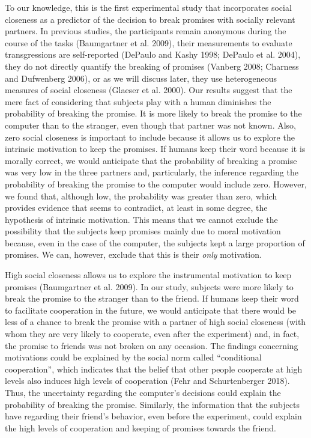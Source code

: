 \documentclass[smallextended]{svjour3}       %
\begin{document}
To our knowledge, this is the first experimental study that incorporates
social closeness as a predictor of the decision to break promises with
socially relevant partners. In previous studies, the participants remain
anonymous during the course of the tasks (Baumgartner et al. 2009),
their measurements to evaluate transgressions are self-reported (DePaulo
and Kashy 1998; DePaulo et al. 2004), they do not directly quantify the
breaking of promises (Vanberg 2008; Charness and Dufwenberg 2006), or as
we will discuss later, they use heterogeneous measures of social
closeness (Glaeser et al. 2000). Our results suggest that the mere fact
of considering that subjects play with a human diminishes the
probability of breaking the promise. It is more likely to break the
promise to the computer than to the stranger, even though that partner
was not known. Also, zero social closeness is important to include
because it allows us to explore the intrinsic motivation to keep the
promises. If humans keep their word because it is morally correct, we
would anticipate that the probability of breaking a promise was very low
in the three partners and, particularly, the inference regarding the
probability of breaking the promise to the computer would include zero.
However, we found that, although low, the probability was greater than
zero, which provides evidence that seems to contradict, at least in some
degree, the hypothesis of intrinsic motivation. This means that we
cannot exclude the possibility that the subjects keep promises mainly
due to moral motivation because, even in the case of the computer, the
subjects kept a large proportion of promises. We can, however, exclude
that this is their \emph{only} motivation.

High social closeness allows us to explore the instrumental motivation
to keep promises (Baumgartner et al. 2009). In our study, subjects were
more likely to break the promise to the stranger than to the friend. If
humans keep their word to facilitate cooperation in the future, we would
anticipate that there would be less of a chance to break the promise
with a partner of high social closeness (with whom they are very likely
to cooperate, even after the experiment) and, in fact, the promise to
friends was not broken on any occasion. The findings concerning
motivations could be explained by the social norm called ``conditional
cooperation'', which indicates that the belief that other people
cooperate at high levels also induces high levels of cooperation (Fehr
and Schurtenberger 2018). Thus, the uncertainty regarding the computer's
decisions could explain the probability of breaking the promise.
Similarly, the information that the subjects have regarding their
friend's behavior, even before the experiment, could explain the high
levels of cooperation and keeping of promises towards the friend.
\end{document}
